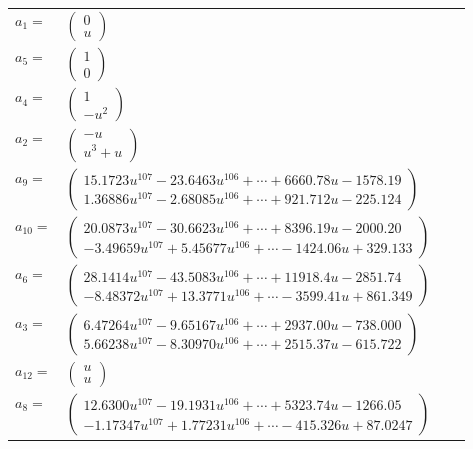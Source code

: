 \documentclass[1p]{elsarticle_modified}
\theoremstyle{definition}
\begin{document}
\begin{tabular}{m{7pt} m{180pt} m{7pt} m{180pt} }
\flushright $a_{1}=$&$\begin{pmatrix}0\\u\end{pmatrix}$ \\
\flushright $a_{5}=$&$\begin{pmatrix}1\\0\end{pmatrix}$ \\
\flushright $a_{4}=$&$\begin{pmatrix}1\\- u^2\end{pmatrix}$ \\
\flushright $a_{2}=$&$\begin{pmatrix}- u\\u^3+u\end{pmatrix}$ \\
\flushright $a_{9}=$&$\begin{pmatrix}15.1723 u^{107}-23.6463 u^{106}+\cdots+6660.78 u-1578.19\\1.36886 u^{107}-2.68085 u^{106}+\cdots+921.712 u-225.124\end{pmatrix}$ \\
\flushright $a_{10}=$&$\begin{pmatrix}20.0873 u^{107}-30.6623 u^{106}+\cdots+8396.19 u-2000.20\\-3.49659 u^{107}+5.45677 u^{106}+\cdots-1424.06 u+329.133\end{pmatrix}$ \\
\flushright $a_{6}=$&$\begin{pmatrix}28.1414 u^{107}-43.5083 u^{106}+\cdots+11918.4 u-2851.74\\-8.48372 u^{107}+13.3771 u^{106}+\cdots-3599.41 u+861.349\end{pmatrix}$ \\
\flushright $a_{3}=$&$\begin{pmatrix}6.47264 u^{107}-9.65167 u^{106}+\cdots+2937.00 u-738.000\\5.66238 u^{107}-8.30970 u^{106}+\cdots+2515.37 u-615.722\end{pmatrix}$ \\
\flushright $a_{12}=$&$\begin{pmatrix}u\\u\end{pmatrix}$ \\
\flushright $a_{8}=$&$\begin{pmatrix}12.6300 u^{107}-19.1931 u^{106}+\cdots+5323.74 u-1266.05\\-1.17347 u^{107}+1.77231 u^{106}+\cdots-415.326 u+87.0247\end{pmatrix}$ \\

\end{tabular}
\end{document}
